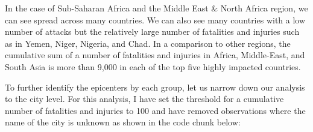 \documentclass[11pt,oneside,a4paper]{reedthesis}
\newenvironment{Shaded}{\begin{snugshade}}{\end{snugshade}}
\newcommand{\KeywordTok}[1]{\textcolor[rgb]{0.13,0.29,0.53}{\textbf{#1}}}
\newcommand{\DataTypeTok}[1]{\textcolor[rgb]{0.13,0.29,0.53}{#1}}
\newcommand{\DecValTok}[1]{\textcolor[rgb]{0.00,0.00,0.81}{#1}}
\newcommand{\StringTok}[1]{\textcolor[rgb]{0.31,0.60,0.02}{#1}}
\newcommand{\CommentTok}[1]{\textcolor[rgb]{0.56,0.35,0.01}{\textit{#1}}}
\newcommand{\OperatorTok}[1]{\textcolor[rgb]{0.81,0.36,0.00}{\textbf{#1}}}
\newcommand{\NormalTok}[1]{#1}
\begin{document}
In the case of Sub-Saharan Africa and the Middle East \& North Africa
region, we can see spread across many countries. We can also see many
countries with a low number of attacks but the relatively large number
of fatalities and injuries such as in Yemen, Niger, Nigeria, and Chad.
In a comparison to other regions, the cumulative sum of a number of
fatalities and injuries in Africa, Middle-East, and South Asia is more
than 9,000 in each of the top five highly impacted countries.

To further identify the epicenters by each group, let us narrow down our
analysis to the city level. For this analysis, I have set the threshold
for a cumulative number of fatalities and injuries to 100 and have
removed observations where the name of the city is unknown as shown in
the code chunk below:
\begin{Shaded}
\end{Shaded}
\end{document}
